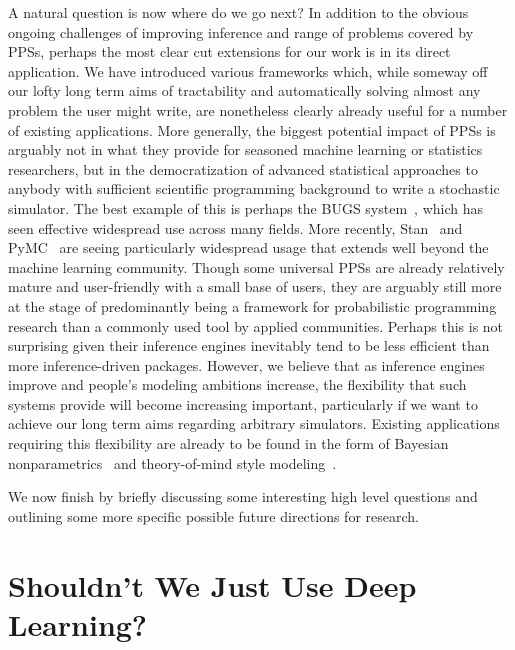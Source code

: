 A natural question is now where do we go next?  In addition to the obvious ongoing challenges
of improving inference and range of problems covered by PPSs, perhaps the most clear cut 
extensions for our
work is in its direct application.  We have introduced various frameworks which, while someway off
our lofty long term aims of tractability and automatically solving almost any problem the 
user might write, are nonetheless clearly already useful for a number of existing applications.  
More generally, the biggest
potential impact of PPSs is arguably not in what they provide for seasoned machine learning or 
statistics researchers, but in the democratization of advanced statistical approaches to anybody with sufficient
scientific programming background to write a stochastic simulator.  The best example of this is
perhaps the BUGS system~\cite{spiegelhalter1996bugs}, which has seen effective widespread use across
many fields.
More recently, Stan~\citep{carpenter2015stan} and PyMC~\citep{salvatier2016probabilistic} 
are seeing particularly widespread usage that extends well beyond
the machine learning community.  Though some universal PPSs are already relatively 
mature and user-friendly with a small base of users, they are arguably still more
at the stage of predominantly being a framework for probabilistic programming
research than a commonly used tool by applied communities.  Perhaps this is not surprising given
their inference engines inevitably tend to be less efficient than more inference-driven packages.
However, we believe that as inference engines improve and people's modeling ambitions
increase, the flexibility that such systems provide will become increasing important,
particularly if we want to achieve our long term aims regarding arbitrary simulators.
Existing applications requiring this flexibility are already to be found in the form of Bayesian
nonparametrics~\citep{dhir2017interpreting} and theory-of-mind style 
modeling~\citep{stuhlmuller2014reasoning}.

We now finish by briefly discussing some interesting high level questions and 
outlining some more specific possible future directions for research. 

\section{Shouldn't We Just Use Deep Learning?}

